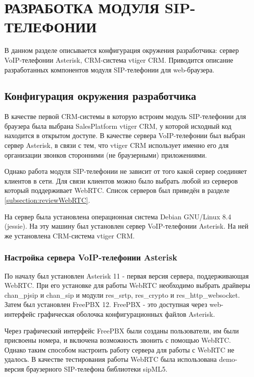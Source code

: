 \chapter{РАЗРАБОТКА МОДУЛЯ SIP-ТЕЛЕФОНИИ}

В данном разделе описывается конфигурация окружения разработчика: сервер VoIP-телефонии Asterisk, CRM-система vtiger CRM. Приводится описание разработанных компонентов модуля SIP-телефонии для web-браузера.

\section{Конфигурация окружения разработчика}
\label{section:config}

В качестве первой CRM-системы в которую встроим модуль SIP-телефонии для браузера была выбрана SalesPlatform vtiger CRM, у которой исходный код находится в открытом доступе. В качестве сервера VoIP-телефонии был выбран сервер Asterisk, в связи с тем, что vtiger CRM использует именно его для организации звонков сторонними (не браузерными) приложениями.

Однако работа модуля SIP-телефонии не зависит от того какой сервер соединяет клиентов в сети. Для связи клиентов можно было выбрать любой из серверов который поддерживает WebRTC. Список серверов был приведён в разделе \ref{subsection:reviewWebRTC}.

На сервер была установлена операционная система Debian GNU/Linux 8.4 (jessie). На эту машину был установлен сервер VoIP-телефонии Asterisk. На ней же установлена CRM-система vtiger CRM.

\subsection{Настройка сервера VoIP-телефонии Asterisk}

По началу был установлен Asterisk 11 - первая версия сервера, поддерживающая WebRTC.\cite{asterisk} При его установке для работы WebRTC необходимо выбрать драйверы chan\_pjsip и chan\_sip и модули res\_srtp, res\_crypto и res\_http\_websocket. Затем был установлен FreePBX 12. FreePBX - это доступная через web-интерфейс графическая оболочка конфигурационных файлов Asterisk.\cite{FreePBX}

Через графический интерфейс FreePBX были созданы пользователи, им были присвоены номера, и включена возможность звонить с помощью WebRTC. Однако таким способом настроить работу сервера для работы с WebRTC не удалось. В качестве тестирования работы WebRTC была использована demo-версия браузерного SIP-телефона библиотеки sipML5.

